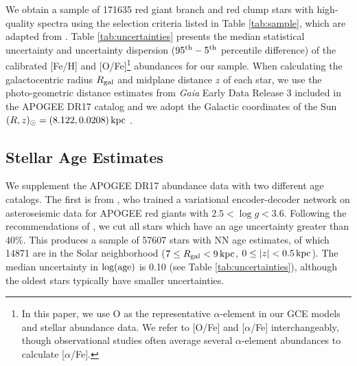 \documentclass[twocolumn,twocolappendix,linenumbers]{aastex631}
\newcommand{\aFe}{[$\alpha$/Fe]\xspace}
\newcommand{\kpc}{\,{\rm kpc}}
\newcommand{\Gyr}{\,{\rm Gyr}}
\begin{document}
We obtain a sample of \num{171635} red giant branch and red clump stars with high-quality spectra using the selection criteria listed in Table \ref{tab:sample}, which are adapted from \citet{hayden_chemical_2015}. Table \ref{tab:uncertainties} presents the median statistical uncertainty and uncertainty dispersion ($95^{\rm th} - 5^{\rm th}$ percentile difference) of the calibrated [Fe/H] and [O/Fe]\footnote{
    In this paper, we use O as the representative $\alpha$-element in our GCE models and stellar abundance data. We refer to [O/Fe] and \aFe interchangeably, though observational studies often average several $\alpha$-element abundances to calculate \aFe.
} abundances for our sample. When calculating the galactocentric radius $R_{\rm gal}$ and midplane distance $z$ of each star, we use the \citet{bailer-jones_estimating_2021} photo-geometric distance estimates from {\it Gaia} Early Data Release 3 \citep{gaia_collaboration_gaia_2016,gaia_collaboration_gaia_2021} included in the APOGEE DR17 catalog and we adopt the Galactic coordinates of the Sun $(R,z)_\odot=(8.122, 0.0208)\kpc$ \citep{gravity_collaboration_detection_2018,bennett_vertical_2019}.

\subsection{Stellar Age Estimates}
\label{sec:age-estimates}

We supplement the APOGEE DR17 abundance data with two different age catalogs. The first is from \citet{leung_variational_2023}, who trained a variational encoder-decoder network on asteroseismic data for APOGEE red giants with $2.5<\log g<3.6$. 
Following the recommendations of \citet{leung_variational_2023}, we cut all stars which have an age uncertainty greater than 40\%. This produces a sample of \num{57607} stars with NN age estimates, of which \num{14871} are in the Solar neighborhood ($7\leq R_{\rm gal}<9\kpc$, $0\leq|z|<0.5\kpc$). The median uncertainty in $\log({\rm age})$ is 0.10 (see Table \ref{tab:uncertainties}), although the oldest stars typically have smaller uncertainties.
\end{document}
